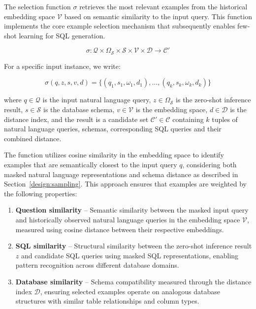 The selection function $\sigma$ retrieves the most relevant examples from the
historical embedding space $\mathcal{V}$ based on semantic similarity to the
input query. This function implements the core example selection mechanism 
that subsequently enables few-shot learning for SQL generation.

$$
\sigma: \mathcal{Q} \times \Omega_{\mathcal{S}} \times \mathcal{S} \times \mathcal{V} \times \mathcal{D} \rightarrow \mathcal{C}'
$$

\vspace{0.5em}

For a specific input instance, we write:

$$
\sigma(q, z, s, v, d) = \{(q_1, s_1, \omega_1, d_1), \ldots, (q_k, s_k, \omega_k, d_k)\}
$$

\vspace{0.5em}

where $q \in \mathcal{Q}$ is the input natural language query, $z \in \Omega_{\mathcal{S}}$
is the zero-shot inference result, $s \in \mathcal{S}$ is the database schema,
$v \in \mathcal{V}$ is the embedding space, $d \in \mathcal{D}$ is the distance index,
and the result is a candidate set $\mathcal{C}' \in \mathcal{C}$ containing $k$
tuples of natural language queries, schemas, corresponding SQL queries and their
combined distance.

The function utilizes cosine similarity in the embedding space to identify examples
that are semantically closest to the input query $q$, considering both masked natural
language representations and schema distance as described in Section~\ref{design:sampling}.
This approach ensures that examples are weighted by the following properties:

\begin{enumerate}
    \item \textbf{Question similarity} – Semantic similarity between the masked input
        query and historically observed natural language queries in the embedding space
        $\mathcal{V}$, measured using cosine distance between their respective embeddings.
    \item \textbf{SQL similarity} – Structural similarity between the zero-shot inference
        result $z$ and candidate SQL queries using masked SQL representations, enabling
        pattern recognition across different database domains.
    \item \textbf{Database similarity} – Schema compatibility measured through the distance
        index $\mathcal{D}$, ensuring selected examples operate on analogous database
        structures with similar table relationships and column types.
\end{enumerate}

